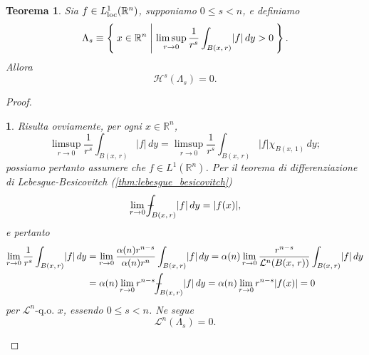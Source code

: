 \documentclass[a4paper,10pt,openright,oneside]{book}
\theoremstyle{theoremstyle}
\newtheorem{teorema}{Teorema}[section]
\theoremstyle{theoremstylewoheader}
\theoremstyle{theoremstyle}
\theoremstyle{proofsecstyle}
\newtheorem{proofsec}{}
\theoremstyle{nonumberplain}
\newtheorem{proof}{Dim.}
\newcommand{\RR}{\ensuremath{\mathbb{R}}}
\newcommand{\Leb}{\ensuremath{\mathcal{L}}}
\newcommand{\Haus}{\ensuremath{\mathcal{H}}}
\newcommand{\abs}[1]{\ensuremath{\lvert #1 \rvert}}
\newcommand{\qogni}[2]{\ensuremath{#2\text{-q.o. $\!#1$}}}
\def\Xint#1{\mathchoice
	{\XXint\displaystyle\textstyle{#1}}%
	{\XXint\textstyle\scriptstyle{#1}}%
	{\XXint\scriptstyle\scriptscriptstyle{#1}}%
	{\XXint\scriptscriptstyle\scriptscriptstyle{#1}}%
	\!\int}
\def\XXint#1#2#3{{\setbox0=\hbox{$#1{#2#3}{\int}$}
	\vcenter{\hbox{$#2#3$}}\kern-.5\wd0}}
\def\dashint{\Xint-}
\begin{document}
\begin{teorema}
Sia $f \in L_\textup{loc}^1 (\RR^n)$, supponiamo $0 \le s < n$, e definiamo
\[
\Lambda_s \equiv \Set{ x \in \RR^n | \limsup_{r \to 0} \frac{1}{r^s} \int_{B(x,\, r)} \abs{f}\, dy > 0 }.
\]
Allora
\[
\Haus^s(\Lambda_s) = 0.
\]
\end{teorema}

\begin{proof}
\begin{proofsec}
Risulta ovviamente, per ogni $x \in \RR^n$,
\[
\limsup_{r \to 0} \frac{1}{r^s} \int_{B(x,\, r)} \abs{f}\, dy = \limsup_{r \to 0} \frac{1}{r^s} \int_{B(x,\, r)} \abs{f}\chi_{B(x,\, 1)}\, dy;
\]
possiamo pertanto assumere che $f \in L^1(\RR^n)$. Per il teorema di differenziazione di Lebesgue-Besi\-covitch (\ref{thm:lebesgue_besicovitch})
\[
\lim_{r \to 0} \dashint_{B(x,\, r)} \abs{f}\, dy = \abs{f(x)},
\]
e pertanto
\begin{align*}
\lim_{r \to 0} \frac{1}{r^s} \int_{B(x,\, r)} \abs{f}\, dy &= \lim_{r \to 0} \frac{\alpha(n) r^{n-s}}{\alpha(n) r^n} \int_{B(x,\, r)} \abs{f}\, dy = \alpha(n) \lim_{r \to 0} \frac{r^{n-s}}{\Leb^n(B(x,\, r))} \int_{B(x,\, r)} \abs{f}\, dy\\
&= \alpha(n) \lim_{r \to 0} r^{n-s} \dashint_{B(x,\, r)} \abs{f}\, dy = \alpha(n) \lim_{r \to 0} r^{n-s} \abs{f(x)} = 0
\end{align*}
per $\qogni{x}{\Leb^n}$, essendo $0 \le s < n$. Ne segue
\[
\Leb^n(\Lambda_s) = 0.
\]
\end{proofsec}


\end{proof}
\end{document}
